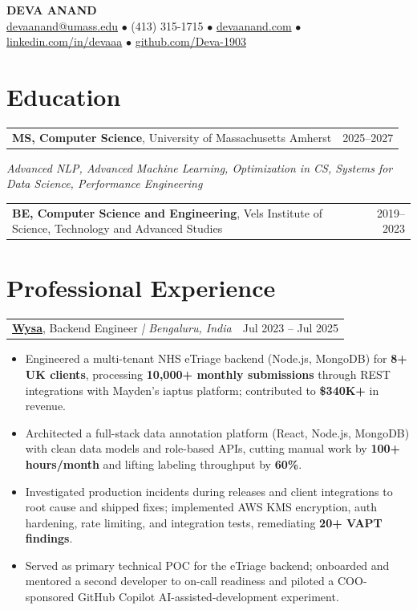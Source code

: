 \documentclass[letterpaper,11pt]{article}
\makeatletter
\newcommand{\eduItem}[3]{%
  \begin{tabular*}{\textwidth}{@{}l@{\extracolsep{\fill}}r@{}}
    \textbf{#1}, #2 & #3 \\
  \end{tabular*}\par
}
\newcommand{\expItem}[4]{%
  \vspace{2pt}
  \begin{tabular*}{\textwidth}{@{}l@{\extracolsep{\fill}}r@{}}
    \textbf{#1}, #2 \textit{| #3} & #4 \\
  \end{tabular*}\par\vspace{-2pt}
}
\makeatother
\begin{document}
\begin{center}
    {\fontsize{18}{20}\selectfont\bfseries DEVA ANAND}\\ \vspace{3pt}
    {\small
    \href{mailto:devaanand@umass.edu}{devaanand@umass.edu}
    \enspace$\bullet$\enspace
    (413) 315-1715
    \enspace$\bullet$\enspace
    \href{https://devaanand.com}{devaanand.com}
    \enspace$\bullet$\enspace
    \href{https://linkedin.com/in/devaaa/}{linkedin.com/in/devaaa}
    \enspace$\bullet$\enspace
    \href{https://github.com/Deva-1903}{github.com/Deva-1903}}
\end{center}
\vspace{-6pt}

\section{Education}
\eduItem{MS, Computer Science}{University of Massachusetts Amherst}{2025--2027}
{\small\textit{Advanced NLP, Advanced Machine Learning, Optimization in CS, Systems for Data Science, Performance Engineering}}\par
\vspace{3pt}
\eduItem{BE, Computer Science and Engineering}{Vels Institute of Science, Technology and Advanced Studies}{2019--2023}

\section{Professional Experience}

\expItem{\href{https://www.wysa.io}{Wysa}}{Backend Engineer}{Bengaluru, India}{Jul 2023 -- Jul 2025}
\begin{itemize}
  \item Engineered a multi-tenant NHS eTriage backend (Node.js, MongoDB) for \textbf{8+ UK clients}, processing \textbf{10{,}000+ monthly submissions} through REST integrations with Mayden's iaptus platform; contributed to \textbf{\$340K+} in revenue.
  \item Architected a full-stack data annotation platform (React, Node.js, MongoDB) with clean data models and role-based APIs, cutting manual work by \textbf{100+ hours/month} and lifting labeling throughput by \textbf{60\%}.
  \item Investigated production incidents during releases and client integrations to root cause and shipped fixes; implemented AWS KMS encryption, auth hardening, rate limiting, and integration tests, remediating \textbf{20+ VAPT findings}.
  \item Served as primary technical POC for the eTriage backend; onboarded and mentored a second developer to on-call readiness and piloted a COO-sponsored GitHub Copilot AI-assisted-development experiment.
\end{itemize}
\end{document}

